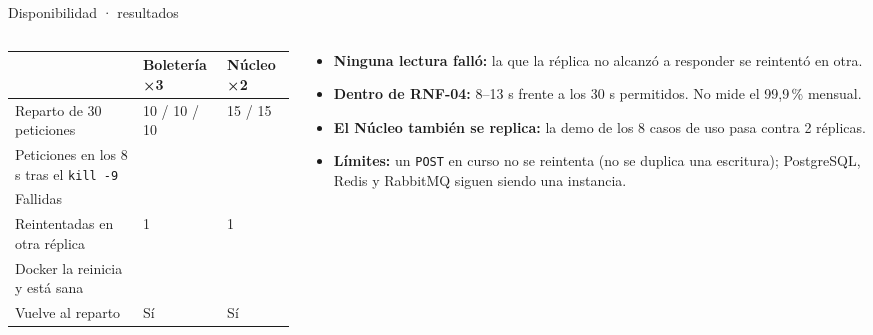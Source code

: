 \begin{frame}{Disponibilidad · resultados}
\begin{columns}[T]
\begin{column}{0.55\textwidth}
\small
\begin{tabular}{@{}L{3.6cm}L{1.8cm}L{1.6cm}@{}}
\toprule
& \textbf{Boletería ×3} & \textbf{Núcleo ×2}\\
\midrule
Reparto de 30 peticiones & 10 / 10 / 10 & 15 / 15\\
Peticiones en los 8 s tras el \texttt{kill -9} & \leavevmode{} & \leavevmode{}\\
Fallidas & \leavevmode{} & \leavevmode{}\\
Reintentadas en otra réplica & 1 & 1\\
Docker la reinicia y está sana & \leavevmode{} & \leavevmode{}\\
Vuelve al reparto & Sí & Sí\\
\bottomrule
\end{tabular}
\end{column}
\begin{column}{0.43\textwidth}
\small
\begin{itemize}\setlength\itemsep{0.35em}
\item \textbf{Ninguna lectura falló:} la que la réplica no alcanzó a responder se reintentó en otra.
\item \textbf{Dentro de RNF-04:} 8--13 s frente a los 30 s permitidos. No mide el 99,9\,\% mensual.
\item \textbf{El Núcleo también se replica:} la demo de los 8 casos de uso pasa contra 2 réplicas.
\item \textbf{Límites:} un \texttt{POST} en curso no se reintenta (no se duplica una escritura);
PostgreSQL, Redis y RabbitMQ siguen siendo una instancia.
\end{itemize}
\end{column}
\end{columns}
\end{frame}

